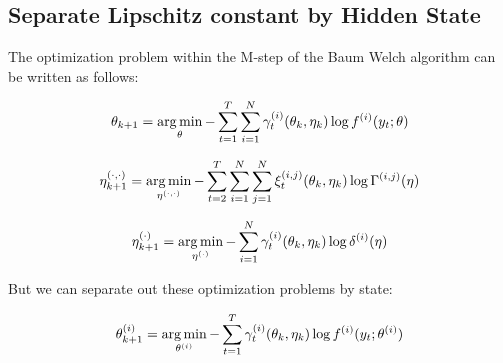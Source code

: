 



\subsection{Separate Lipschitz constant by Hidden State}
\label{subsec:diff_Ls}

The optimization problem within the M-step of the Baum Welch algorithm can be written as follows:

\begin{equation} 
    \theta_{k+1} = \operatorname*{arg\,min}_{\theta} - \sum_{t=1}^T \sum_{i=1}^N \gamma^{(i)}_t(\theta_{k}, \eta_{k}) \log f^{(i)}(y_t;\theta)
    \label{eqn:min_F}
\end{equation}

\begin{equation}
    \eta^{(\cdot,\cdot)}_{k+1} = \operatorname*{arg\,min}_{\eta^{(\cdot,\cdot)}} - \sum_{t=2}^T \sum_{i=1}^N \sum_{j=1}^N \xi^{(i,j)}_t(\theta_{k}, \eta_{k}) \log \Gamma^{(i,j)}(\eta)
    \label{eqn:min_G}
\end{equation}

\begin{equation}
    \eta^{(\cdot)}_{k+1} = \operatorname*{arg\,min}_{\eta^{(\cdot)}} - \sum_{i=1}^N \gamma^{(i)}_t(\theta_{k},\eta_{k}) \log \delta^{(i)}(\eta)
    \label{eqn:min_G}
\end{equation}

But we can separate out these optimization problems by state:

\begin{equation} 
    \theta^{(i)}_{k+1} = \operatorname*{arg\,min}_{\theta^{(i)}} - \sum_{t=1}^T \gamma^{(i)}_t(\theta_{k}, \eta_{k}) \log f^{(i)}(y_t;\theta^{(i)})
    \label{eqn:min_F}
\end{equation}

